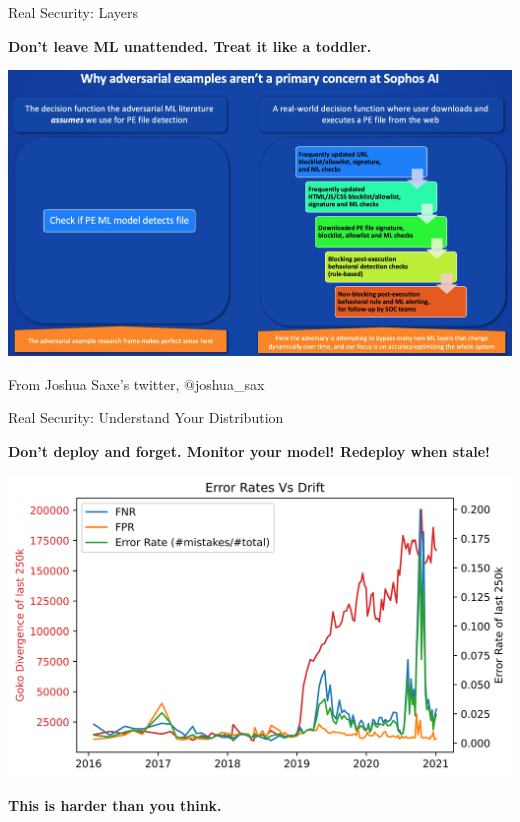 \documentclass{beamer}
\begin{document}
\begin{frame}{Real Security: Layers}
    \begin{center}
        \textbf{Don't leave ML unattended. Treat it like a toddler.}
        \vspace{10pt}

        \includegraphics[scale=0.15]{sophos_ML_model.jpg}

        From Joshua Saxe's twitter, $@$joshua\_sax
    \end{center}
\end{frame}

\begin{frame}{Real Security: Understand Your Distribution}
    \begin{center}
        \textbf{Don't deploy and forget. Monitor your model! Redeploy when stale!}
        \vspace{10pt}
        
        \includegraphics[scale=0.5]{overall_vs_error.png}

        \textbf{This is harder than you think.} 
    \end{center}
\end{frame}
\end{document}
